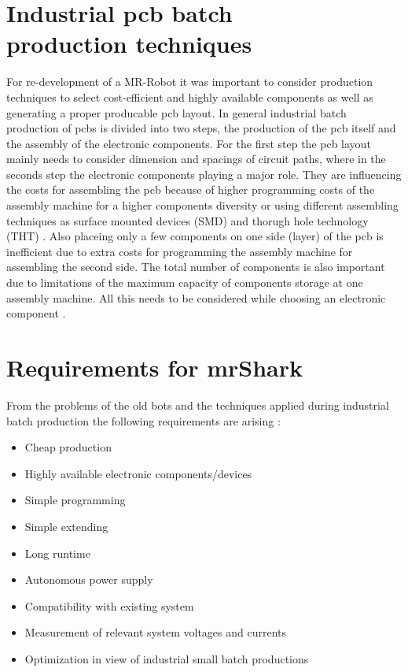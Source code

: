 \documentclass{acm_proc_article-sp}
\begin{document}
\section{Industrial pcb batch\\ production techniques}
For re-development of a MR-Robot it was important to consider production
techniques to select cost-efficient and highly available components as well as
generating a proper producable pcb layout. In general industrial batch
production of pcbs is divided into two steps, the production of the pcb itself
and the assembly of the electronic components. For the first step the
pcb layout mainly needs to consider dimension and spacings of circuit paths,
where in the seconds step the electronic components playing a major role. They
are influencing the costs for assembling the pcb because of higher programming
costs of the assembly machine for a higher components diversity or using
different assembling techniques as surface mounted devices (SMD) \cite{sautter:88} and
thorugh hole technology (THT) \cite{scheel:97}. Also placeing only a few components on one
side (layer) of the pcb is inefficient due to extra costs for programming the assembly
machine for assembling the second side. The total number of components is also
important due to limitations of the maximum capacity of components storage at
one assembly machine. All this needs to be considered while choosing an
electronic component \cite{eilers:13}.

\section{Requirements for mrShark}
From the problems of the old bots and the techniques applied during industrial
batch production the following requirements are arising \cite{eilers:13}:
\begin{itemize}
  \item Cheap production
  \item Highly available electronic components/devices
  \item Simple programming
  \item Simple extending
  \item Long runtime
  \item Autonomous power supply
  \item Compatibility with existing system
  \item Measurement of relevant system voltages and currents
  \item Optimization in view of industrial small batch productions
\end{itemize}
\end{document}
